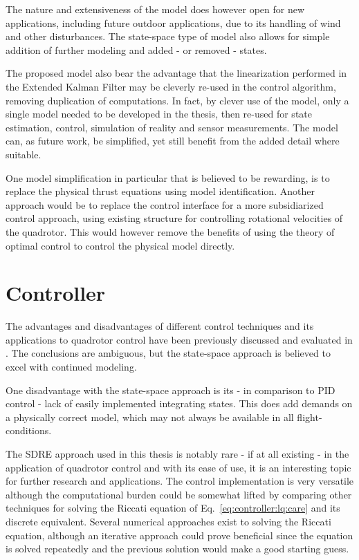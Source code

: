         The nature and extensiveness of the model does however open
        for new applications, including future outdoor applications, due
        to its handling of wind and other disturbances.
        The state-space type of model also allows for simple addition
        of further modeling and added - or removed - states.

        The proposed model also bear the advantage that the
        linearization performed in the Extended Kalman Filter
        may be cleverly re-used in the control algorithm, removing duplication
        of computations. In fact, by clever use of the model,
        only a single model needed to be developed in the thesis, then re-used for
        state estimation, control, simulation of reality and sensor measurements.
        The model can, as future work, be simplified, yet still benefit from the
        added detail where suitable.

        One model simplification in particular that is believed to be rewarding,
        is to replace the physical thrust equations using model identification.
        Another approach would be to replace the
        control interface for a more subsidiarized control approach, using
        existing structure for controlling rotational velocities of the
        quadrotor. This would however remove the benefits of using
        the theory of optimal control to control the physical model directly.

    \section{Controller}
        The advantages and disadvantages of different control techniques
        and its applications to quadrotor control have been previously
        discussed and evaluated in \citep{bouabdallah04pid}.
        The conclusions are ambiguous, but the state-space approach is believed to
        excel with continued modeling.

        One disadvantage with the state-space approach is its - in comparison
        to PID control - lack of easily implemented integrating states.
        This does add demands on a physically correct model, which may
        not always be available in all flight-conditions.

        The SDRE approach used in this thesis is notably rare - if at
        all existing - in the application of quadrotor control
        and with its ease of use, it is an interesting topic for further research and applications.
        The control implementation is very versatile although the computational
        burden could be somewhat lifted by comparing other techniques for solving
        the Riccati equation of Eq.~\eqref{eq:controller:lq:care} and its discrete equivalent.
        Several numerical approaches exist to solving the Riccati equation,
        although an iterative approach could prove beneficial since
        the equation is solved repeatedly and the previous solution would make a
        good starting guess.

